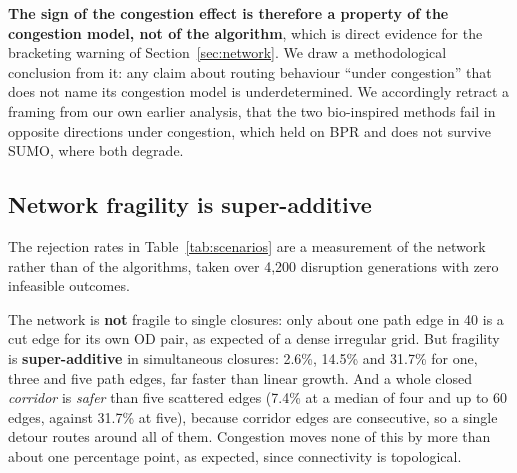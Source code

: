 \textbf{The sign of the congestion effect is therefore a property of the
congestion model, not of the algorithm}, which is direct evidence for the
bracketing warning of Section~\ref{sec:network}. We draw a methodological
conclusion from it: any claim about routing behaviour ``under congestion''
that does not name its congestion model is underdetermined. We accordingly
retract a framing from our own earlier analysis, that the two bio-inspired
methods fail in opposite directions under congestion, which held on BPR and does not survive SUMO, where both degrade.

\subsection{Network fragility is super-additive}
\label{sec:fragility}

The rejection rates in Table~\ref{tab:scenarios} are a measurement of the
network rather than of the algorithms, taken over 4{,}200 disruption
generations with zero infeasible outcomes.

The network is \textbf{not} fragile to single closures: only about one path
edge in 40 is a cut edge for its own OD pair, as expected of a dense
irregular grid. But fragility is \textbf{super-additive} in simultaneous closures: 2.6\%, 14.5\% and 31.7\%
for one, three and five path edges, far
faster than linear growth. And a whole closed \emph{corridor} is
\emph{safer} than five scattered edges (7.4\% at a median of four and up to
60 edges, against 31.7\% at five), because corridor edges are consecutive, so
a single detour routes around all of them. Congestion moves none of this by
more than about one percentage point, as expected, since connectivity is
topological.
